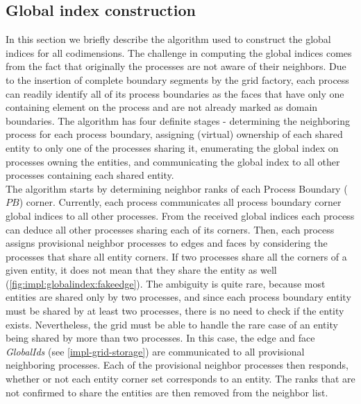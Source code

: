 \subsection{Global index construction}
\label{impl-grid-constructor-globalindex}

\noindent
In this section we briefly describe the algorithm used to construct the global indices for all codimensions. The challenge in computing the global indices comes from the fact that originally the processes are not aware of their neighbors. Due to the insertion of complete boundary segments by the grid factory, each process can readily identify all of its process boundaries as the faces that have only one containing element on the process and are not already marked as domain boundaries. The algorithm has four definite stages - determining the neighboring process for each process boundary, assigning (virtual) ownership of each shared entity to only one of the processes sharing it, enumerating the global index on processes owning the entities, and communicating the global index to all other processes containing each shared entity. \\

\noindent
The algorithm starts by determining neighbor ranks of each Process Boundary ($PB$) corner. Currently, each process communicates all process boundary corner global indices to all other processes. From the received global indices each process can deduce all other processes sharing each of its corners. Then, each process assigns provisional neighbor processes to edges and faces by considering the processes that share all entity corners. If two processes share all the corners of a given entity, it does not mean that they share the entity as well (\cref{fig:impl:globalindex:fakeedge}). The ambiguity is quite rare, because most entities are shared only by two processes, and since each process boundary entity must be shared by at least two processes, there is no need to check if the entity exists. Nevertheless, the grid must be able to handle the rare case of an entity being shared by more than two processes. In this case, the edge and face \textit{GlobalIds} (see \cref{impl-grid-storage}) are communicated to all provisional neighboring processes. Each of the provisional neighbor processes then responds, whether or not each entity corner set corresponds to an entity. The ranks that are not confirmed to share the entities are then removed from the neighbor list. \\

